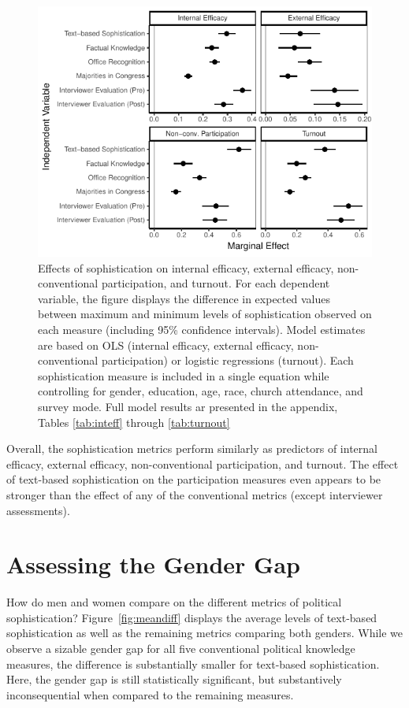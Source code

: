 \documentclass[12pt]{article}
\begin{document}
\begin{figure}[h]\centering
\includegraphics{../fig/knoweff.pdf}
\caption{Effects of sophistication on internal efficacy, external efficacy, non-conventional participation, and turnout. For each dependent variable, the figure displays the difference in expected values between maximum and minimum levels of sophistication observed on each measure (including 95\% confidence intervals). Model estimates are based on OLS (internal efficacy, external efficacy, non-conventional participation) or logistic regressions (turnout). Each sophistication measure is included in a single equation while controlling for gender, education, age, race, church attendance, and survey mode. Full model results ar presented in the appendix, Tables \ref{tab:inteff} through \ref{tab:turnout}}\label{fig:knoweff}
\end{figure}

Overall, the sophistication metrics perform similarly as predictors of internal efficacy, external efficacy, non-conventional participation, and turnout. The effect of text-based sophistication on the participation measures even appears to be stronger than the effect of any of the conventional metrics (except interviewer assessments).


\section*{Assessing the Gender Gap}

How do men and women compare on the different metrics of political sophistication? Figure~\ref{fig:meandiff} displays the average levels of text-based sophistication as well as the remaining metrics comparing both genders. While we observe a sizable gender gap for all five conventional political knowledge measures, the difference is substantially smaller for text-based sophistication. Here, the gender gap is still statistically significant, but substantively inconsequential when compared to the remaining measures.
\end{document}

